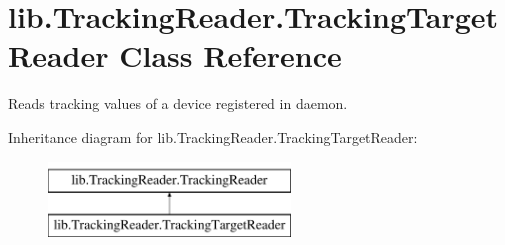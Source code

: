 \hypertarget{classlib_1_1TrackingReader_1_1TrackingTargetReader}{\section{lib.\-Tracking\-Reader.\-Tracking\-Target\-Reader \-Class \-Reference}
\label{classlib_1_1TrackingReader_1_1TrackingTargetReader}
}


\-Reads tracking values of a device registered in daemon.  


\-Inheritance diagram for lib.\-Tracking\-Reader.\-Tracking\-Target\-Reader\-:\begin{figure}[H]
\begin{center}
\leavevmode
\includegraphics[height=2.000000cm]{classlib_1_1TrackingReader_1_1TrackingTargetReader}
\end{center}
\end{figure}
